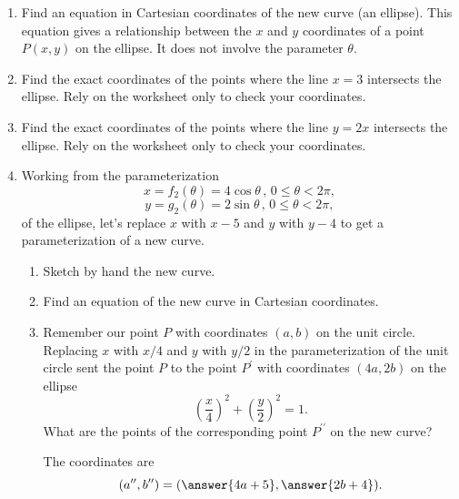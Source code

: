 \documentclass{ximera}
\begin{document}
\begin{example}
\begin{enumerate}
\item Find an equation in Cartesian coordinates of the new curve (an ellipse). This equation gives a relationship between the $x$ and $y$ coordinates of a point $P(x,y)$ on the ellipse. It does not involve the parameter $\theta$.

\item Find the exact coordinates of the points where the line $x=3$ intersects the ellipse. Rely on the worksheet only to check your coordinates.

\item Find the exact coordinates of the points where the line $y=2x$ intersects the ellipse. Rely on the worksheet only to check your coordinates.

\item Working from the parameterization 
\[ 
     x = f_2 (\theta) = 4\cos\theta \, , \, 0\leq \theta <2\pi ,
\]
\[
   y = g_2 (\theta) = 2\sin\theta \, , \, 0\leq \theta <2\pi ,
\]
of the ellipse, let's replace $x$ with $x-5$ and $y$ with $y-4$ to get a parameterization of a new curve.

\begin{enumerate}
\item Sketch by hand the new curve.

\item Find an equation of the new curve in Cartesian coordinates.

\item Remember our point $P$ with coordinates $(a,b)$ on the unit circle. Replacing $x$ with $x/4$ and $y$ with $y/2$ in the parameterization of the unit circle sent the point $P$ to the point $P^\prime$ with coordinates $(4a, 2b)$ on the ellipse
\[
  \left( \frac{x}{4} \right)^2 + \left( \frac{y}{2} \right)^2 = 1.
\]
What are the points of the corresponding point $P^{\prime\prime}$ on the new curve?

The coordinates are 
\[
   (a^{\prime\prime} , b^{\prime\prime}) = (\answer{4a+5} , \answer{2b+4} ) .
\]


\end{enumerate}

\end{enumerate}
\end{example}
\end{document}
